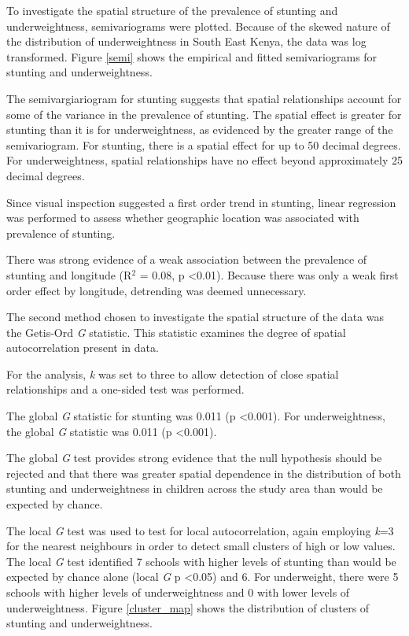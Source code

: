 \documentclass[11pt,a4paper,twoside]{article}\usepackage[]{graphicx}\usepackage[]{color}
\begin{document}
To investigate the spatial structure of the prevalence of stunting and underweightness, semivariograms were plotted. 
Because of the skewed nature of the distribution of underweightness in South East Kenya, the data was log transformed. 
Figure \ref{semi} shows the empirical and fitted semivariograms for stunting and underweightness. 

The semivargiariogram for stunting suggests that spatial relationships account for some of the variance in the prevalence of stunting. 
The spatial effect is greater for stunting than it is for underweightness, as evidenced by the greater range of the semivariogram. 
For stunting, there is a spatial effect for up to 50 decimal degrees. 
For underweightness, spatial relationships have no effect beyond approximately 25 decimal degrees. 

Since visual inspection suggested a first order trend in stunting, linear regression was performed to assess whether geographic location was associated with prevalence of stunting. 


There was strong evidence of a weak association between the prevalence of stunting and longitude (R$^2$ = 0.08, p \textless 0.01).
Because there was only a weak first order effect by longitude, detrending was deemed unnecessary. 

The second method chosen to investigate the spatial structure of the data was the Getis-Ord  \textit{G} statistic. 
This statistic examines the degree of spatial autocorrelation present in data. 

For the analysis, \textit{k} was set to three to allow detection of close spatial relationships and a one-sided test was performed.


The global \textit{G} statistic for stunting was 0.011 (p \textless 0.001).
For underweightness, the global \textit{G} statistic was 0.011 (p \textless 0.001).

The global \textit{G} test provides strong evidence that the null hypothesis should be rejected and that there was greater spatial dependence in the distribution of both stunting and underweightness in children across the study area than would be expected by chance. 



The local \textit{G} test was used to test for local autocorrelation, again employing \textit{k}=3 for the nearest neighbours in order to detect small clusters of high or low values. 
The local \textit{G} test identified 7 schools with higher levels of stunting than would be expected by chance alone (local \textit{G} p \textless 0.05) and 6. 
For underweight, there were 5 schools with higher levels of underweightness and 0 with lower levels of underweightness. 
Figure \ref{cluster_map} shows the distribution of clusters of stunting and underweightness.
\end{document}
